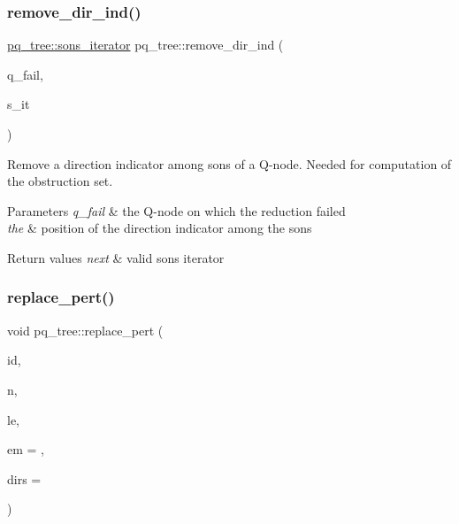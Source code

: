 \subsubsection{\texorpdfstring{remove\+\_\+dir\+\_\+ind()}{remove\_dir\_ind()}}
{\footnotesize\ttfamily \mbox{\hyperlink{structsymlist__iterator}{pq\+\_\+tree\+::sons\+\_\+iterator}} pq\+\_\+tree\+::remove\+\_\+dir\+\_\+ind (\begin{DoxyParamCaption}\item[{\mbox{\hyperlink{classq__node}{q\+\_\+node}} $\ast$}]{q\+\_\+fail,  }\item[{\mbox{\hyperlink{structsymlist__iterator}{sons\+\_\+iterator}}}]{s\+\_\+it }\end{DoxyParamCaption})}



Remove a direction indicator among sons of a Q-\/node. Needed for computation of the obstruction set. 


\begin{DoxyParams}{Parameters}
{\em q\+\_\+fail} & the Q-\/node on which the reduction failed \\
\hline
{\em the} & position of the direction indicator among the sons\\
\hline
\end{DoxyParams}

\begin{DoxyRetVals}{Return values}
{\em next} & valid sons iterator \\
\hline
\end{DoxyRetVals}
\mbox{\label{classpq__tree_ae201bdcb7bb1d53f36685c7c35b8d9dd}} 
\subsubsection{\texorpdfstring{replace\+\_\+pert()}{replace\_pert()}}
{\footnotesize\ttfamily void pq\+\_\+tree\+::replace\+\_\+pert (\begin{DoxyParamCaption}\item[{int}]{id,  }\item[{\mbox{\hyperlink{classnode}{node}}}]{n,  }\item[{const list$<$ \mbox{\hyperlink{classpq__leaf}{pq\+\_\+leaf}} $\ast$$>$ \&}]{le,  }\item[{\mbox{\hyperlink{classplanar__embedding}{planar\+\_\+embedding}} $\ast$}]{em = {},  }\item[{list$<$ \mbox{\hyperlink{classdirection__indicator}{direction\+\_\+indicator}} $>$ $\ast$}]{dirs = {} }\end{DoxyParamCaption})}



